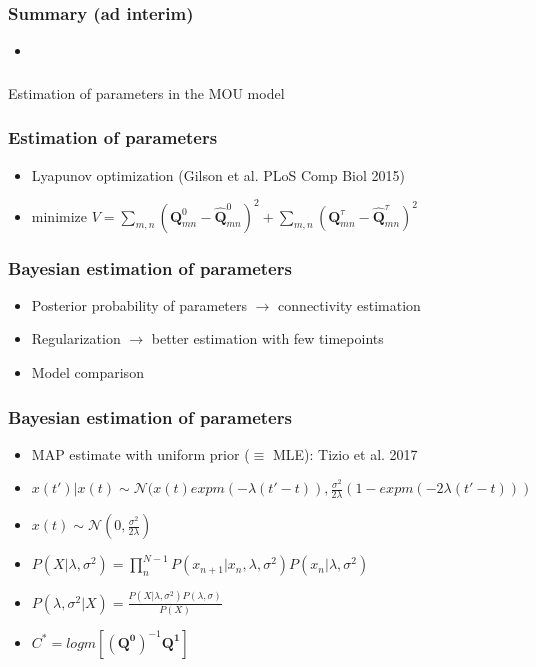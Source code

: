 \documentclass[final]{beamer}
\begin{document}
\begin{frame}
	\frametitle{Summary (ad interim)}
	\begin{itemize}
		\item 
	\end{itemize}
\end{frame}

\begin{frame}
\frametitle{}
\centering
Estimation of parameters in the MOU model
\end{frame}

\begin{frame}
\transdissolve
\frametitle{Estimation of parameters}
\begin{itemize}
	\item Lyapunov optimization (Gilson et al. PLoS Comp Biol 2015)
	\item minimize $V = \sum_{m,n} (\mathbf{Q}_{mn}^0 - \mathbf{\hat{Q}}_{mn}^0)^2 +
		\sum_{m,n} (\mathbf{Q}_{mn}^{\tau} - \mathbf{\hat{Q}}_{mn}^{\tau})^2$
\end{itemize}
\end{frame}

\begin{frame}
\transdissolve
\frametitle{Bayesian estimation of parameters}
\begin{itemize}
		\pause
	\item Posterior probability of parameters $\rightarrow$ connectivity estimation 
		\pause
	\item Regularization $\rightarrow$ better estimation with few timepoints
		\pause
	\item Model comparison 
\end{itemize}
\end{frame}

\begin{frame}
\transdissolve
\frametitle{Bayesian estimation of parameters}
\begin{itemize}
	\item MAP estimate with uniform prior ($\equiv$ MLE): Tizio et al. 2017
	\item $x(t')|x(t) \sim \mathcal{N}(x(t)expm(-\lambda (t'-t)), \frac{\sigma^2}{2\lambda}(1-expm(-2\lambda (t'-t)))$
	\item $x(t) \sim \mathcal{N}(0, \frac{\sigma^2}{2\lambda})$
	\item $P(X|\lambda, \sigma^2) = \prod_n^{N-1} P(x_{n+1}|x_n, \lambda, \sigma^2)P(x_n|\lambda, \sigma^2)$
	\item $P(\lambda, \sigma^2|X) = \frac{P(X|\lambda, \sigma^2) P(\lambda, \sigma)}{P(X)}$
	\item $C^* = logm[(\mathbf{Q^{0}})^{-1}\mathbf{Q^1}] $
\end{itemize}
\end{frame}
\end{document}
